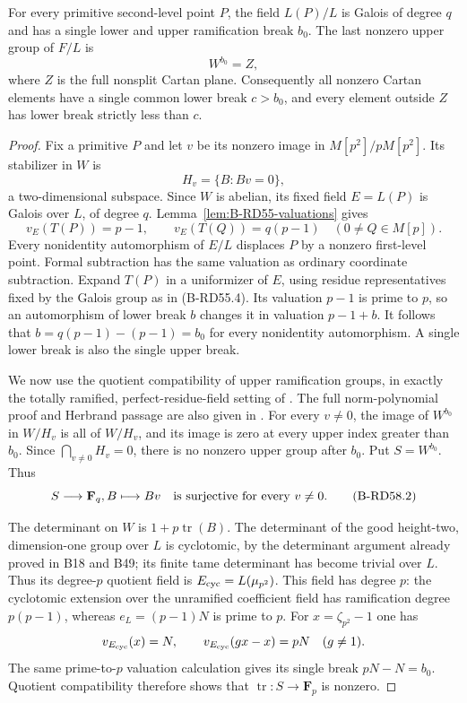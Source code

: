 \begin{lemma}
\label{lem:B-RD58-final-Cartan}
For every primitive second-level point $P$, the field $L(P)/L$ is
Galois of degree $q$ and has a single lower and upper ramification
break $b_0$. The last nonzero upper group of $F/L$ is
\[
                         W^{b_0}=Z,                    \tag{B-RD58.1}
\]
where $Z$ is the full nonsplit Cartan plane. Consequently all nonzero
Cartan elements have a single common lower break $c>b_0$, and every
element outside $Z$ has lower break strictly less than $c$.
\end{lemma}
\begin{proof}
Fix a primitive $P$ and let $v$ be its nonzero image in
$M[p^2]/pM[p^2]$. Its stabilizer in $W$ is
\[
                   H_v=\{B:Bv=0\},
\]
a two-dimensional subspace. Since $W$ is abelian, its fixed field
$E=L(P)$ is Galois over $L$, of degree $q$.
Lemma~\ref{lem:B-RD55-valuations} gives
\[
 v_E(T(P))=p-1,\qquad
 v_E(T(Q))=q(p-1)\quad(0\ne Q\in M[p]).
\]
Every nonidentity automorphism of $E/L$ displaces $P$ by a nonzero
first-level point. Formal subtraction has the same valuation as
ordinary coordinate subtraction. Expand $T(P)$ in a uniformizer
of $E$, using residue representatives fixed by the Galois group as
in (B-RD55.4). Its valuation $p-1$ is prime to $p$, so an
automorphism of lower break $b$ changes it in valuation $p-1+b$.
It follows that $b=q(p-1)-(p-1)=b_0$ for every nonidentity
automorphism. A single lower break is also the single upper break.

We now use the quotient compatibility of upper ramification groups,
in exactly the totally ramified, perfect-residue-field setting of
\cite[\S3.1, Proposition~3, p.~128]{Serre1961LocalClosed}. The full norm-polynomial proof and Herbrand passage are also given in
\cite[Proposition~3.7, Theorem~3.10 and Proposition~3.13,
pp.~14--16]{ColmezCorpsLocaux}.
For every $v\ne0$, the image of $W^{b_0}$ in $W/H_v$ is all of
$W/H_v$, and its image is zero at every upper index greater than
$b_0$. Since $\bigcap_{v\ne0}H_v=0$, there is no nonzero upper
group after $b_0$. Put $S=W^{b_0}$. Thus
\[
                 S\longrightarrow\mathbf F_q,
                         B\longmapsto Bv
               \quad\hbox{is surjective for every }v\ne0.       \tag{B-RD58.2}
\]

The determinant on $W$ is $1+p\operatorname{tr}(B)$.
The determinant of the good height-two, dimension-one group over
$L$ is cyclotomic, by the determinant argument already proved in
B18 and B49; its finite tame determinant has become trivial over $L$.
Thus its degree-$p$ quotient field is $E_{\rm cyc}=L(\mu_{p^2})$.
This field has degree $p$: the cyclotomic extension over the
unramified coefficient field has ramification degree $p(p-1)$,
whereas $e_L=(p-1)N$ is prime to $p$.
For $x=\zeta_{p^2}-1$ one has
\[
 v_{E_{\rm cyc}}(x)=N,
 \qquad v_{E_{\rm cyc}}(g x-x)=pN\quad(g\ne1).
\]
The same prime-to-$p$ valuation calculation gives its single break
$pN-N=b_0$. Quotient compatibility therefore shows that
$\operatorname{tr}:S\to\mathbf F_p$ is nonzero.


\end{proof}
